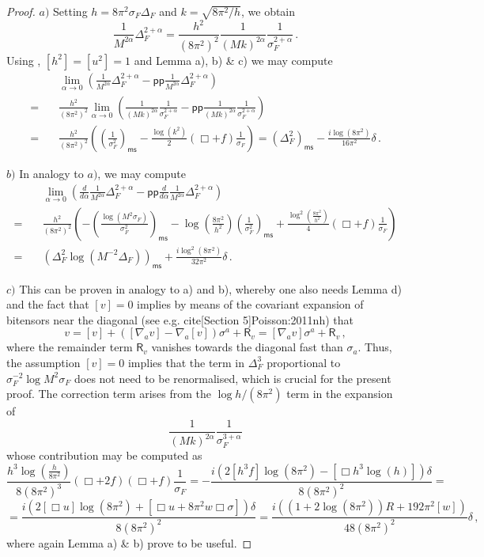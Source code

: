 \documentclass[10pt]{book}
\newcommand{\pp}{\mathsf{pp}}
\newcommand{\ms}{\mathsf{ms}}
\newcommand{\Rsf}{\mathsf{R}}
\theoremstyle{break}
\newtheorem{proof}{Proof}
\begin{document}
\begin{proof}
$a)$ Setting $h=8\pi^2\sigma_F \Delta_F$ and $k=\sqrt{8\pi^2/h}$, we obtain
%
$$\frac{1}{M^{2\alpha}}\Delta_F^{2+\alpha}=\frac{h^2}{(8\pi^2)^2}\frac{1}{(Mk)^{2\alpha}}\frac{1}{\sigma_F^{2+\alpha}}\,.$$ 
%
Using %
, $[h^2]=[u^2]=1$ and Lemma %
a), b) \& c) we may compute
%
\begin{align*}&\lim_{\alpha\to 0}\left(\frac{1}{M^{2\alpha}}\Delta_F^{2+\alpha}-\pp\frac{1}{M^{2\alpha}}\Delta_F^{2+\alpha}\right)\\
%
=\quad&\frac{h^2}{(8\pi^2)^2}\lim_{\alpha\to 0}\left(\frac{1}{(Mk)^{2\alpha}}\frac{1}{\sigma_F^{2+\alpha}}-\pp\frac{1}{(Mk)^{2\alpha}}\frac{1}{\sigma_F^{2+\alpha}}\right)\\
%
=\quad&\frac{h^2}{(8\pi^2)^2} \left(\left(\frac{1}{\sigma^2_F}\right)_\ms-\frac{\log (k^2)}{2}\left(\Box + f\right)\frac{1}{\sigma_F}\right)=(\Delta^2_F)_\ms-\frac{i\log(8\pi^2)}{16\pi^2}\delta\,.\end{align*}

$b)$ In analogy to $a)$, we may compute
%
\begin{align*}&\lim_{\alpha\to 0}\left(\frac{d}{d\alpha}\frac{1}{M^{2\alpha}}\Delta_F^{2+\alpha}-\pp\frac{d}{d\alpha}\frac{1}{M^{2\alpha}}\Delta_F^{2+\alpha}\right)\\
%
=\quad&\frac{h^2}{(8\pi^2)^2} \left(-\left(\frac{\log \left(M^2 \sigma_F\right)}{\sigma^2_F}\right)_\ms-\log\left(\frac{8\pi^2}{h^2}\right)\left(\frac{1}{\sigma^2_F}\right)_\ms+\frac{\log^2 \left(\frac{8\pi^2}{h^2}\right)}{4}\left(\Box + f\right)\frac{1}{\sigma_F}\right)\\
%
=\quad &\left(\Delta^2_F\log \left(M^{-2}\Delta_F\right)\right)_\ms+\frac{i\log^2(8\pi^2)}{32\pi^2}\delta\,.\end{align*}
 
$c)$ This can be proven in analogy to a) and b), whereby one also needs Lemma 
d) and the fact that $[v]=0$ implies by means of the covariant expansion of bitensors near the diagonal (see e.g. cite[Section 5]{Poisson:2011nh}) that 
$$v=[v]+([\nabla_a v]-\nabla_a[v])\sigma^a+\Rsf_v=[\nabla_a v]\sigma^a+\Rsf_v\,,$$
where the remainder term $\Rsf_v$ vanishes towards the diagonal fast than $\sigma_a$. Thus, the assumption $[v]=0$ implies that the term in $\Delta^3_F$ proportional to $\sigma^{-2}_F \log M^2\sigma_F$ does not need to be renormalised, which is crucial for the present proof. The correction term arises from the  $\log h/(8\pi^2)$ term in the expansion of $$\frac{1}{(Mk)^{2\alpha}}\frac{1}{\sigma_F^{3+\alpha}}$$ whose contribution may be computed as
%
$$\frac{h^3 \log\left( \frac{h}{8\pi^2}\right)}{8(8\pi^2)^3}(\Box+2f)(\Box+f)\frac{1}{\sigma_F}=-\frac{i\left(2[h^3 f]\log(8\pi^2)-[\Box h^3 \log (h)]\right)\delta}{8(8\pi^2)^2}=$$
%
$$=\frac{i\left(2[\Box u]\log(8\pi^2)+[\Box u + 8\pi^2 w\Box \sigma]\right)\delta}{8(8\pi^2)^2}=\frac{i\left((1+2\log(8\pi^2))R+192\pi^2[w]\right)}{48(8\pi^2)^2}\delta\,,$$
%
where again Lemma %
a) \& b) prove to be  useful.
\end{proof}
\end{document}
